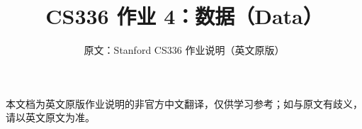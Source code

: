 \documentclass[11pt,a4paper]{ctexart}
\title{\textbf{CS336 作业 4：数据（Data）}}
\author{原文：Stanford CS336 作业说明（英文原版）}
\date{}
\begin{document}
\maketitle
\begin{center}\small
本文档为英文原版作业说明的非官方中文翻译，仅供学习参考；如与原文有歧义，请以英文原文为准。
\end{center}
\tableofcontents
\clearpage

\end{document}
